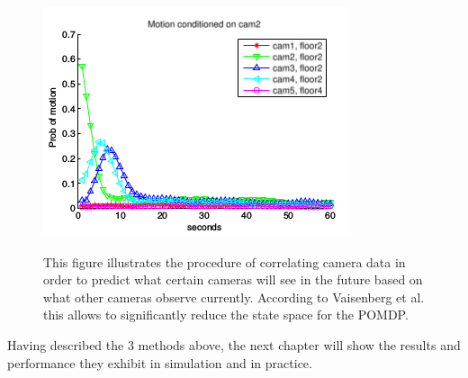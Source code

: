\documentclass[a4paper,11pt,english]{article}
\begin{document}
\begin{figure}[H]
  \caption{
  This figure illustrates the procedure of correlating camera data in order to predict what certain cameras will see in the future based on what other cameras observe currently. According to Vaisenberg et al. \cite{vaisenberg2014scheduling} this allows to significantly reduce the state space for the POMDP.}
  \centering
    \includegraphics[scale=0.5]{vaisenbergmethod2.png}
  \label{vaisenbergcorrelation}
\end{figure}

Having described the 3 methods above, the next chapter will show the results and performance they exhibit in simulation and in practice.
\end{document}
